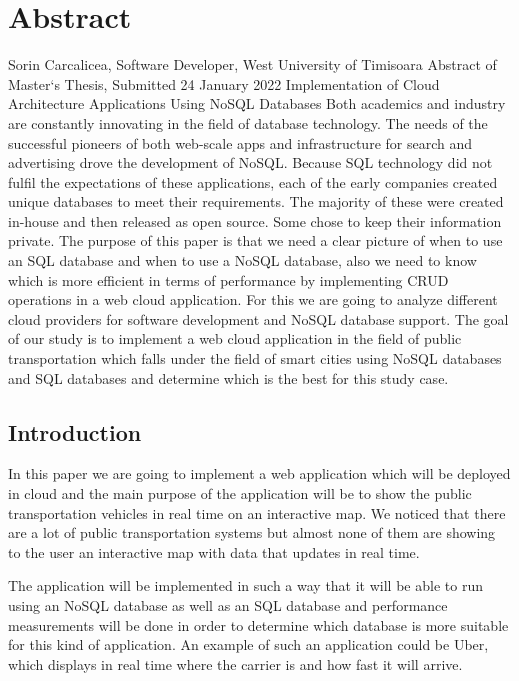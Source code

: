 \chapter{Abstract}\label{sect:abstract}

\tab \tab Sorin Carcalicea, Software Developer, West University of Timisoara
\newline
\tab \tab Abstract of Master`s Thesis, Submitted 24 January 2022
\newline
\tab \tab Implementation of Cloud Architecture Applications Using NoSQL Databases
\newline
\newline
\tab Both academics and industry are constantly innovating in the field of database technology. The needs of the successful pioneers of both web-scale apps and infrastructure for search and advertising drove the development of NoSQL. Because SQL technology did not fulfil the expectations of these applications, each of the early companies created unique databases to meet their requirements. The majority of these were created in-house and then released as open source. Some chose to keep their information private.
\newline
\tab The purpose of this paper is that we need a clear picture of when to use an
SQL database and when to use a NoSQL database, also we need to know which is
more efficient in terms of performance by implementing CRUD operations in a web
cloud application. For this we are going to analyze different cloud providers for
software development and NoSQL database support.
\newline
\tab The goal of our study is to implement a web cloud application in the field of public transportation which falls under the field of smart cities using NoSQL databases and SQL databases and determine which is the best for this study case.

\section {Introduction}
\tab In this paper we are going to implement a web application which will be deployed in cloud and the main purpose of the application will be to show the public transportation vehicles in real time on an interactive map. We noticed that there are a lot of public transportation systems but almost none of them are showing to the user an interactive map with data that updates in real time. \newline

\tab The application will be implemented in such a way that it will be able to run using an NoSQL database as well as an SQL database and performance measurements will be done in order to determine which database is more suitable for this kind of application. An example of such an application could be Uber, which displays in real time where the carrier is and how fast it will arrive.

